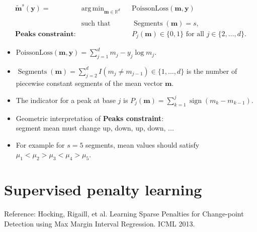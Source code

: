 \documentclass[legalpaper]{article}
\newcommand{\RR}{\mathbb R}
\DeclareMathOperator*{\sign}{sign}
\DeclareMathOperator*{\argmin}{arg\,min}
\DeclareMathOperator*{\Segments}{Segments}
\begin{document}
\begin{equation*}
  \label{argmin:constrained}
  \begin{aligned}
    \mathbf{\tilde m}^s(\mathbf y)  =\ 
    &\argmin_{\mathbf m\in\RR^{d}} && 
    \text{PoissonLoss}
    (\mathbf m, \mathbf y) \\
    \\
    &\text{such that} && \Segments(\mathbf m)=s,\\
    \textbf{Peaks constraint:}
    & && P_j(\mathbf m) \in\{0, 1\} \text{ for all } j\in\{2, \dots, d\}.
  \end{aligned}
\end{equation*}
\begin{itemize}
\item$\text{PoissonLoss}(\mathbf m, \mathbf y)=
  \sum_{j=1}^d m_j - y_j \log m_j$.
\item$\Segments(\mathbf m)=\sum_{j=2}^d I(m_j \neq m_{j-1})\in\{1, \dots, d\}$ is the number of
  piecewise constant segments of the mean vector $\mathbf m$.
\item The indicator for a peak at base $j$ is 
$
  P_j(\mathbf m) = \sum_{k=1}^j \sign( m_k - m_{k-1} ).
$
\item Geometric interpretation of \textbf{Peaks constraint}:\\
  segment mean must change up, down, up, down, ...
\item For example for $s=5$ segments, mean values should satisfy\\
  $\mu_1 < \mu_2 > \mu_3 < \mu_4 > \mu_5$.
\end{itemize}

\newpage

\section*{Supervised penalty learning}
Reference: Hocking, Rigaill, et al. Learning Sparse Penalties for
Change-point Detection using Max Margin Interval Regression. ICML
2013.
\end{document}
